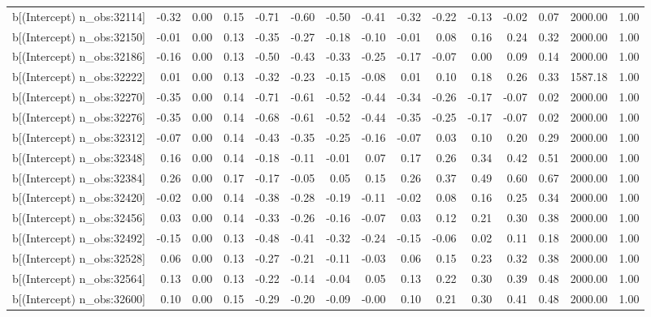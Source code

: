 \begin{table}[ht]
\begin{tabular}{rrrrrrrrrrrrrrr}
  b[(Intercept) n\_obs:32114] & -0.32 & 0.00 & 0.15 & -0.71 & -0.60 & -0.50 & -0.41 & -0.32 & -0.22 & -0.13 & -0.02 & 0.07 & 2000.00 & 1.00 \\ 
  b[(Intercept) n\_obs:32150] & -0.01 & 0.00 & 0.13 & -0.35 & -0.27 & -0.18 & -0.10 & -0.01 & 0.08 & 0.16 & 0.24 & 0.32 & 2000.00 & 1.00 \\ 
  b[(Intercept) n\_obs:32186] & -0.16 & 0.00 & 0.13 & -0.50 & -0.43 & -0.33 & -0.25 & -0.17 & -0.07 & 0.00 & 0.09 & 0.14 & 2000.00 & 1.00 \\ 
  b[(Intercept) n\_obs:32222] & 0.01 & 0.00 & 0.13 & -0.32 & -0.23 & -0.15 & -0.08 & 0.01 & 0.10 & 0.18 & 0.26 & 0.33 & 1587.18 & 1.00 \\ 
  b[(Intercept) n\_obs:32270] & -0.35 & 0.00 & 0.14 & -0.71 & -0.61 & -0.52 & -0.44 & -0.34 & -0.26 & -0.17 & -0.07 & 0.02 & 2000.00 & 1.00 \\ 
  b[(Intercept) n\_obs:32276] & -0.35 & 0.00 & 0.14 & -0.68 & -0.61 & -0.52 & -0.44 & -0.35 & -0.25 & -0.17 & -0.07 & 0.02 & 2000.00 & 1.00 \\ 
  b[(Intercept) n\_obs:32312] & -0.07 & 0.00 & 0.14 & -0.43 & -0.35 & -0.25 & -0.16 & -0.07 & 0.03 & 0.10 & 0.20 & 0.29 & 2000.00 & 1.00 \\ 
  b[(Intercept) n\_obs:32348] & 0.16 & 0.00 & 0.14 & -0.18 & -0.11 & -0.01 & 0.07 & 0.17 & 0.26 & 0.34 & 0.42 & 0.51 & 2000.00 & 1.00 \\ 
  b[(Intercept) n\_obs:32384] & 0.26 & 0.00 & 0.17 & -0.17 & -0.05 & 0.05 & 0.15 & 0.26 & 0.37 & 0.49 & 0.60 & 0.67 & 2000.00 & 1.00 \\ 
  b[(Intercept) n\_obs:32420] & -0.02 & 0.00 & 0.14 & -0.38 & -0.28 & -0.19 & -0.11 & -0.02 & 0.08 & 0.16 & 0.25 & 0.34 & 2000.00 & 1.00 \\ 
  b[(Intercept) n\_obs:32456] & 0.03 & 0.00 & 0.14 & -0.33 & -0.26 & -0.16 & -0.07 & 0.03 & 0.12 & 0.21 & 0.30 & 0.38 & 2000.00 & 1.00 \\ 
  b[(Intercept) n\_obs:32492] & -0.15 & 0.00 & 0.13 & -0.48 & -0.41 & -0.32 & -0.24 & -0.15 & -0.06 & 0.02 & 0.11 & 0.18 & 2000.00 & 1.00 \\ 
  b[(Intercept) n\_obs:32528] & 0.06 & 0.00 & 0.13 & -0.27 & -0.21 & -0.11 & -0.03 & 0.06 & 0.15 & 0.23 & 0.32 & 0.38 & 2000.00 & 1.00 \\ 
  b[(Intercept) n\_obs:32564] & 0.13 & 0.00 & 0.13 & -0.22 & -0.14 & -0.04 & 0.05 & 0.13 & 0.22 & 0.30 & 0.39 & 0.48 & 2000.00 & 1.00 \\ 
  b[(Intercept) n\_obs:32600] & 0.10 & 0.00 & 0.15 & -0.29 & -0.20 & -0.09 & -0.00 & 0.10 & 0.21 & 0.30 & 0.41 & 0.48 & 2000.00 & 1.00 \\ 

\end{tabular}
\end{table}
